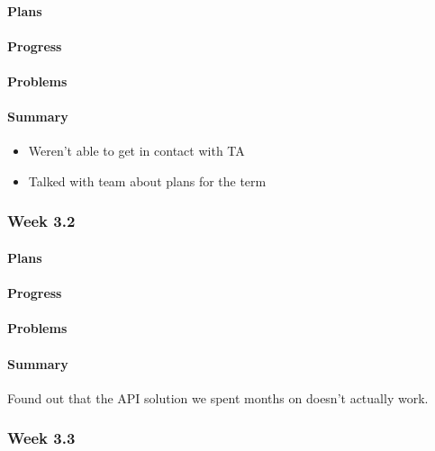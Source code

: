 \documentclass[onecolumn, draftclsnofoot,10pt, compsoc]{article}
\begin{document}
		    \paragraph{Plans} \hfill \break

		    \paragraph{Progress} \hfill \break

		    \paragraph{Problems} \hfill \break

		    \paragraph{Summary} \hfill \break
				\begin{itemize}
                    \item Weren't able to get in contact with TA
                    \item Talked with team about plans for the term
                \end{itemize}

        \subsubsection{Week 3.2}
		    \paragraph{Plans} \hfill \break

		    \paragraph{Progress} \hfill \break

		    \paragraph{Problems} \hfill \break

		    \paragraph{Summary} \hfill \break
		            Found out that the API solution we spent months on doesn't actually work.


		\subsubsection{Week 3.3}
\end{document}
